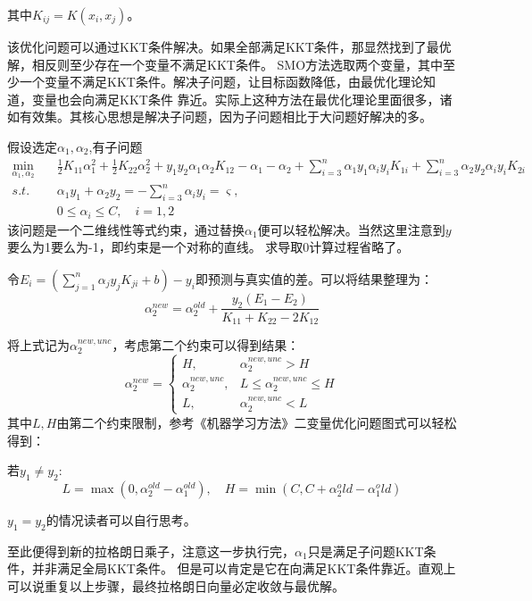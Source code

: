 \documentclass{article}
\begin{document}
        其中$K_{ij}=K(x_i,x_j)$。

        该优化问题可以通过KKT条件解决。如果全部满足KKT条件，那显然找到了最优解，相反则至少存在一个变量不满足KKT条件。
        SMO方法选取两个变量，其中至少一个变量不满足KKT条件。解决子问题，让目标函数降低，由最优化理论知道，变量也会向满足KKT条件
        靠近。实际上这种方法在最优化理论里面很多，诸如有效集。其核心思想是解决子问题，因为子问题相比于大问题好解决的多。

        假设选定$\alpha_1,\alpha_2$,有子问题
        \begin{align*}
            \min_{\alpha_1,\alpha_2} \quad & \frac{1}{2}K_{11}\alpha_1^2+\frac{1}{2}K_{22}\alpha_2^2+y_1y_2\alpha_1\alpha_2K_{12} -\alpha_1-\alpha_2+\sum_{i=3}^{n}\alpha_1y_1\alpha_iy_iK_{1i}+\sum_{i=3}^{n}\alpha_2y_2\alpha_iy_iK_{2i}\\
            s.t. \quad & \alpha_1y_1+\alpha_2y_2=-\sum_{i=3}^{n}\alpha_iy_i=\varsigma , \\
            & 0 \le \alpha_i \le C,\quad i=1,2
        \end{align*}
        该问题是一个二维线性等式约束，通过替换$\alpha_1$便可以轻松解决。当然这里注意到$y$要么为1要么为-1，即约束是一个对称的直线。
        求导取0计算过程省略了。

        令$E_i=(\sum_{j=1}^{n}\alpha_jy_jK_{ji}+b)-y_i$即预测与真实值的差。可以将结果整理为：
        \[\alpha_2^{new}=\alpha_2^{old}+\frac{y_2(E_1-E_2)}{K_{11}+K_{22}-2K_{12}}\]

        将上式记为$\alpha_2^{new,unc}$，考虑第二个约束可以得到结果：
        \[
        \alpha_2^{new}=
        \begin{cases}
            H,& \alpha_2^{new,unc}>H \\
            \alpha_2^{new,unc},& L \le\alpha_2^{new,unc}\le H \\
            L,&\alpha_2^{new,unc} < L
        \end{cases}
        \]
        其中$L,H$由第二个约束限制，参考《机器学习方法》二变量优化问题图式可以轻松得到：

        若$y_1 \neq y_2$:
        \[L=\max(0,\alpha_2^{old}-\alpha_1^{old}),\quad H=\min(C,C+\alpha_2^old-\alpha_1^old)\]

        $y_1 = y_2$的情况读者可以自行思考。

        至此便得到新的拉格朗日乘子，注意这一步执行完，$\alpha_1$只是满足子问题KKT条件，并非满足全局KKT条件。
        但是可以肯定是它在向满足KKT条件靠近。直观上可以说重复以上步骤，最终拉格朗日向量必定收敛与最优解。
\end{document}
